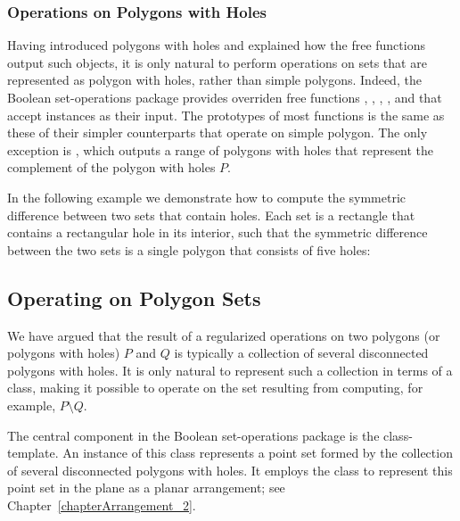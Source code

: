 
\subsubsection{Operations on Polygons with Holes}
\label{bops_sssec:pwh_bops}

Having introduced polygons with holes and explained how the free functions
output such objects, it is only natural to perform operations on sets that
are represented as polygon with holes, rather than simple polygons.
Indeed, the Boolean set-operations package provides overriden free functions
, , , ,
 and  that accept
 instances as their input. The prototypes of
most functions is the same as these of their simpler counterparts that operate
on simple polygon. The only exception is , which
outputs a range of polygons with holes that represent the complement of the
polygon with holes $P$.

In the following example we demonstrate how to compute the symmetric
difference between two sets that contain holes. Each set is a rectangle that
contains a rectangular hole in its interior, such that the symmetric
difference between the two sets is a single polygon that consists of five
holes:


\subsection{Operating on Polygon Sets}
\label{bops_sec:main_component}

We have argued that the result of a regularized operations on two polygons
(or polygons with holes) $P$ and $Q$ is typically a collection of several
disconnected polygons with holes. It is only natural to represent such a
collection in terms of a class, making it possible to operate on the set
resulting from computing, for example, $P \setminus Q$.

The central component in the Boolean set-operations package is the
 class-template. An instance of this class
represents a point set formed by the collection of several disconnected
polygons with holes. It employs the  class to represent
this point set in the plane as a planar arrangement; see
Chapter~\ref{chapterArrangement_2}. 

